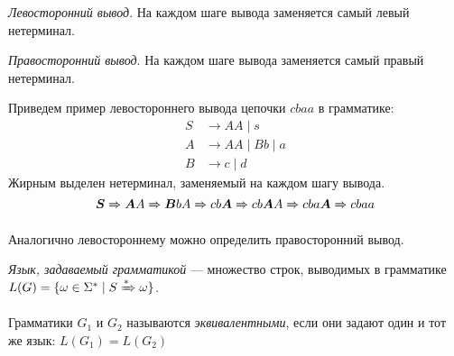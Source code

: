 \begin{definition}
\textit{Левосторонний вывод}. На каждом шаге вывода заменяется самый левый нетерминал.
\end{definition}

\begin{definition}
  \textit{Правосторонний вывод}. На каждом шаге вывода заменяется самый правый нетерминал.
\end{definition}


\begin{example}
Приведем пример левостороннего вывода цепочки $cbaa$ в грамматике:
\begin{align*}
  S &\rightarrow A A \mid s  \\
  A &\rightarrow A A \mid B b \mid a \\
  B &\rightarrow c \mid d
\end{align*}
  Жирным выделен нетерминал, заменяемый на каждом шагу вывода.
  \[ \boldsymbol{S} \xRightarrow[]{} \boldsymbol{A} A \xRightarrow[]{} \boldsymbol{B} b A \xRightarrow[]{} c b \boldsymbol{A} \xRightarrow[]{} c b \boldsymbol{A} A \xRightarrow[]{} c b a \boldsymbol{A} \xRightarrow[]{} c b a a \]
\end{example}

Аналогично левостороннему можно определить правосторонний вывод.

\begin{definition}
\textit{Язык, задаваемый грамматикой} --- множество строк, выводимых в грамматике $L(G) = \{ \omega \in \Sigma^* \mid S \xRightarrow[]{*} \omega \}$.
\end{definition}

\begin{definition}
  Грамматики $G_1$ и $G_2$ называются \textit{эквивалентными}, если они задают один и тот же язык: $L(G_1) = L(G_2)$
\end{definition}


